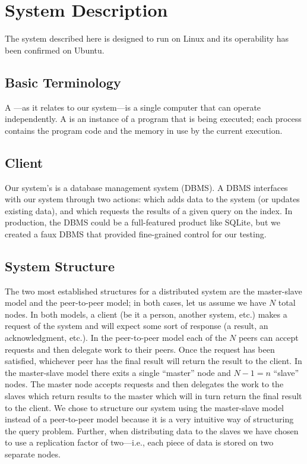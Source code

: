 \section{System Description}
The system described here is designed to run on Linux and its operability has been confirmed on Ubuntu.
%
\subsection{Basic Terminology}
A ---as it relates to our system---is a single computer that can operate independently.
A  is an instance of a program that is being executed; each process contains the program code and the memory in use by the current execution.
%
%
\subsection{Client}
Our system's  is a database management system (DBMS).
A DBMS interfaces with our system through two actions:
 which adds data to the system (or updates existing data), and
 which requests the results of a given query on the index.
In production, the DBMS could be a full-featured product like SQLite, but we created a faux DBMS that provided fine-grained control for our testing.
%
\subsection{System Structure}
The two most established structures for a distributed system are the master-slave model and the peer-to-peer model; in both cases, let us assume we have \(N\) total nodes.
In both models, a client (be it a person, another system, etc.) makes a request of the system and will expect some sort of response (a result, an acknowledgment, etc.).
In the peer-to-peer model each of the \(N\) peers can accept requests and then delegate work to their peers.
Once the request has been satisfied, whichever peer has the final result will return the result to the client.
In the master-slave model there exits a single ``master'' node and \(N - 1 = n\) ``slave'' nodes.
The master node accepts requests and then delegates the work to the slaves which return results to the master which will in turn return the final result to the client.
We chose to structure our system using the master-slave model instead of a peer-to-peer model because it is a very intuitive way of structuring the query problem.
Further, when distributing data to the slaves we have chosen to use a replication factor of two---i.e., each piece of data is stored on two separate nodes.
%
